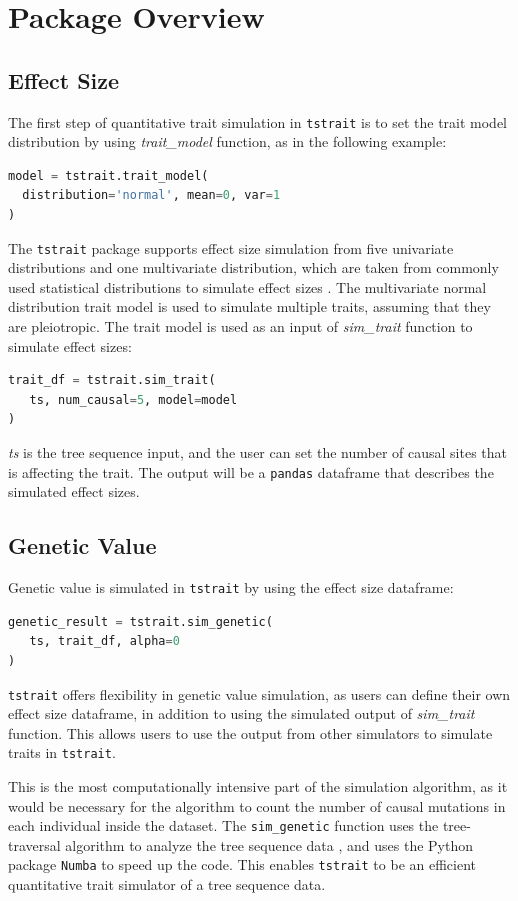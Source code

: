 \documentclass[unnumsec,webpdf,modern,large,namedate]{oup-authoring-template}%
\begin{document}
\section{Package Overview}

\subsection{Effect Size}

The first step of quantitative trait simulation in \texttt{tstrait} is to set
the trait model distribution by using \emph{trait\_model} function, as in the
following example:
\begin{lstlisting}[language=Python]
model = tstrait.trait_model(
  distribution='normal', mean=0, var=1
)
\end{lstlisting}
The \texttt{tstrait} package supports effect size simulation from five
univariate distributions and one multivariate distribution, which are taken
from commonly used statistical distributions to simulate effect sizes
\citep{gaynor2021,haller2023}. The multivariate normal distribution trait model
is used to simulate multiple traits, assuming that they are pleiotropic. The
trait model is used as an input of \emph{sim\_trait} function to simulate
effect sizes:
\begin{lstlisting}[language=Python]
trait_df = tstrait.sim_trait(
   ts, num_causal=5, model=model
)
\end{lstlisting}
\emph{ts} is the tree sequence input, and the user can set the number of causal
sites that is affecting the trait. The output will be a \texttt{pandas}
dataframe \citep{pandas} that describes the simulated effect sizes.

\subsection{Genetic Value}

Genetic value is simulated in \texttt{tstrait} by using the effect size dataframe:
\begin{lstlisting}[language=Python]
genetic_result = tstrait.sim_genetic(
   ts, trait_df, alpha=0
)
\end{lstlisting}
\texttt{tstrait} offers flexibility in genetic value simulation, as users can
define their own effect size dataframe, in addition to using the simulated
output of \emph{sim\_trait} function. This allows users to use the output from
other simulators to simulate traits in \texttt{tstrait}.

This is the most computationally intensive part of the simulation algorithm, as
it would be necessary for the algorithm to count the number of causal mutations
in each individual inside the dataset. The \texttt{sim\_genetic} function uses
the tree-traversal algorithm to analyze the tree sequence data
\citep{ralph2020}, and uses the Python package \texttt{Numba} \citep{numba} to
speed up the code. This enables \texttt{tstrait} to be an efficient
quantitative trait simulator of a tree sequence data.
\end{document}
